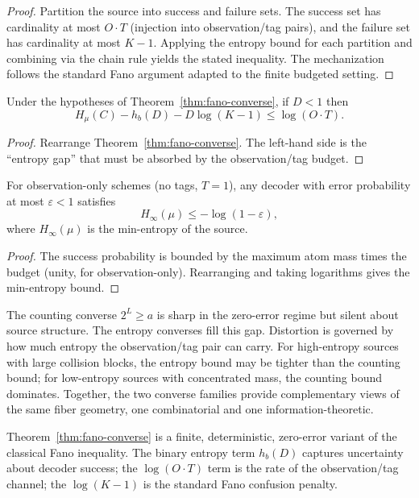 \begin{proof}
Partition the source into success and failure sets. The success set has cardinality at most $O \cdot T$ (injection into observation/tag pairs), and the failure set has cardinality at most $K-1$. Applying the entropy bound for each partition and combining via the chain rule yields the stated inequality. The mechanization follows the standard Fano argument adapted to the finite budgeted setting.
\end{proof}

\begin{corollary}\label{cor:budget-from-error}
Under the hypotheses of Theorem~\ref{thm:fano-converse}, if $D < 1$ then
\[
H_\mu(C) - h_b(D) - D \log(K-1) \le \log(O \cdot T).
\]
\end{corollary}

\begin{proof}
Rearrange Theorem~\ref{thm:fano-converse}. The left-hand side is the ``entropy gap'' that must be absorbed by the observation/tag budget.
\end{proof}

\begin{theorem}\label{thm:min-entropy-bound}
For observation-only schemes (no tags, $T=1$), any decoder with error probability at most $\varepsilon < 1$ satisfies
\[
H_\infty(\mu) \le -\log(1 - \varepsilon),
\]
where $H_\infty(\mu)$ is the min-entropy of the source.
\end{theorem}

\begin{proof}
The success probability is bounded by the maximum atom mass times the budget (unity, for observation-only). Rearranging and taking logarithms gives the min-entropy bound.
\end{proof}

\begin{remark}
The counting converse $2^L \ge a$ is sharp in the zero-error regime but silent about source structure. The entropy converses fill this gap. Distortion is governed by how much entropy the observation/tag pair can carry. For high-entropy sources with large collision blocks, the entropy bound may be tighter than the counting bound; for low-entropy sources with concentrated mass, the counting bound dominates. Together, the two converse families provide complementary views of the same fiber geometry, one combinatorial and one information-theoretic.

Theorem~\ref{thm:fano-converse} is a finite, deterministic, zero-error variant of the classical Fano inequality. The binary entropy term $h_b(D)$ captures uncertainty about decoder success; the $\log(O \cdot T)$ term is the rate of the observation/tag channel; the $\log(K-1)$ is the standard Fano confusion penalty.
\end{remark}

